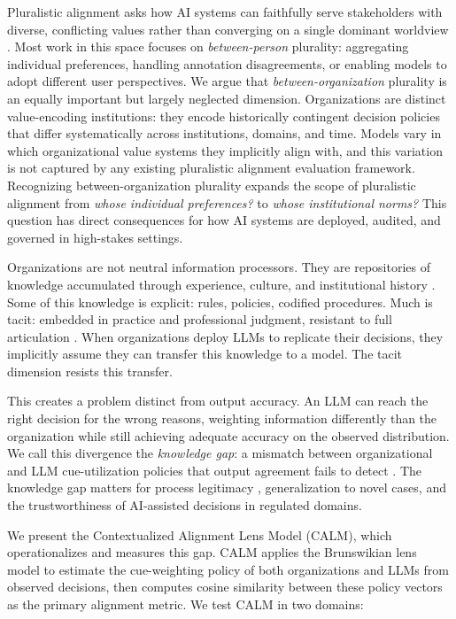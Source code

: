 \documentclass{article}
\begin{document}
Pluralistic alignment asks how AI systems can faithfully serve stakeholders with diverse, conflicting values rather than converging on a single dominant worldview \citep{sorensen2024roadmap}. Most work in this space focuses on \emph{between-person} plurality: aggregating individual preferences, handling annotation disagreements, or enabling models to adopt different user perspectives. We argue that \emph{between-organization} plurality is an equally important but largely neglected dimension. Organizations are distinct value-encoding institutions: they encode historically contingent decision policies that differ systematically across institutions, domains, and time. Models vary in which organizational value systems they implicitly align with, and this variation is not captured by any existing pluralistic alignment evaluation framework. Recognizing between-organization plurality expands the scope of pluralistic alignment from \emph{whose individual preferences?} to \emph{whose institutional norms?} This question has direct consequences for how AI systems are deployed, audited, and governed in high-stakes settings.

Organizations are not neutral information processors. They are repositories of knowledge accumulated through experience, culture, and institutional history \citep{nonaka1994dynamic}. Some of this knowledge is explicit: rules, policies, codified procedures. Much is tacit: embedded in practice and professional judgment, resistant to full articulation \citep{polanyi1966tacit,pakarinen2023relational}. When organizations deploy LLMs to replicate their decisions, they implicitly assume they can transfer this knowledge to a model. The tacit dimension resists this transfer.

This creates a problem distinct from output accuracy. An LLM can reach the right decision for the wrong reasons, weighting information differently than the organization while still achieving adequate accuracy on the observed distribution. We call this divergence the \emph{knowledge gap}: a mismatch between organizational and LLM cue-utilization policies that output agreement fails to detect \citep{geirhos2020shortcut,lebovitz2021ai}. The knowledge gap matters for process legitimacy \citep{tyler1988psychology}, generalization to novel cases, and the trustworthiness of AI-assisted decisions in regulated domains.

We present the Contextualized Alignment Lens Model (CALM), which operationalizes and measures this gap. CALM applies the Brunswikian lens model \citep{brunswik1952conceptual,hammond1964psychology} to estimate the cue-weighting policy of both organizations and LLMs from observed decisions, then computes cosine similarity between these policy vectors as the primary alignment metric. We test CALM in two domains:
\end{document}
